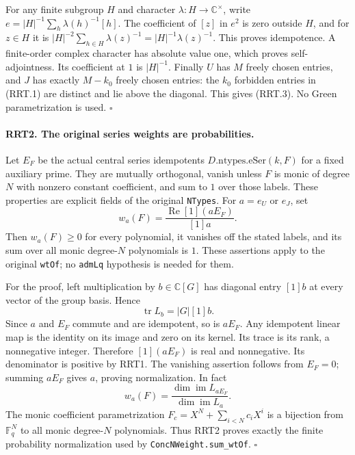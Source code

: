 \documentclass[11pt,a4paper]{article}
\numberwithin{equation}{section}
\theoremstyle{remark}\newtheorem{remark}[theorem]{Remark}
\begin{document}
For any finite subgroup $H$ and character $\lambda:H\to\mathbb C^\times$,
write $e=|H|^{-1}\sum_h\lambda(h)^{-1}[h]$.
The coefficient of $[z]$ in $e^2$ is zero outside
$H$, and for $z\in H$ it is
$|H|^{-2}\sum_{h\in H}\lambda(z)^{-1}=|H|^{-1}\lambda(z)^{-1}$.
This proves idempotence.  A finite-order complex character has
absolute value one, which proves self-adjointness.  Its coefficient
at $1$ is $|H|^{-1}$.  Finally $U$ has $M$ freely chosen entries,
and $J$ has exactly $M-k_0$ freely chosen entries: the $k_0$
forbidden entries in (RRT.1) are distinct and lie above the diagonal.
This gives (RRT.3).  No Green parametrization is used.
\hfill$\square$

\paragraph{RRT2. The original series weights are probabilities.}
\label{claim:RRT2}
Let $E_F$ be the actual central series idempotents
$D.\mathrm{ntypes}.\mathrm{eSer}(k,\allowbreak{} F)$ for a fixed auxiliary prime.
They are mutually orthogonal, vanish unless $F$ is monic of degree
$N$ with nonzero constant coefficient, and sum to $1$ over those
labels.  These properties are explicit fields of the original
\texttt{NTypes}.  For $a=e_U$ or $e_J$, set
\[
             w_a(F)=\frac{\operatorname{Re}[1](aE_F)}{[1]a}.
 \tag{RRT.5}
\]
Then $w_a(F)\ge0$ for every polynomial, it vanishes off the stated
labels, and its sum over all monic degree-$N$ polynomials is $1$.
These assertions apply to the original \texttt{wt\allowbreak Of}; no
\texttt{adm\allowbreak Lq} hypothesis is needed for them.

For the proof, left multiplication by $b\in\mathbb C[G]$ has
diagonal entry $[1]b$ at every vector of the group basis.  Hence
\[
                 \operatorname{tr}L_b=|G|[1]b.
 \tag{RRT.6}
\]
Since $a$ and $E_F$ commute and are idempotent, so is $aE_F$.
Any idempotent linear map is the identity on its image and zero on
its kernel.  Its trace is its rank, a nonnegative integer.
Therefore $[1](aE_F)$ is real and nonnegative.  Its denominator
is positive by RRT1.  The vanishing assertion follows from
$E_F=0$; summing $aE_F$ gives $a$, proving normalization.
In fact
\[
 w_a(F)=\frac{\dim\operatorname{im}L_{aE_F}}
                     {\dim\operatorname{im}L_a}.
 \tag{RRT.7}
\]
The monic coefficient parametrization
$F_c=X^N+\sum_{i<N}c_iX^i$ is a bijection from
$\mathbb F_q^N$ to all monic degree-$N$ polynomials.  Thus
RRT2 proves exactly the finite probability normalization used by
\texttt{Conc\allowbreak NWeight.\allowbreak sum\_\allowbreak wt\allowbreak Of}.
\hfill$\square$
\end{document}

